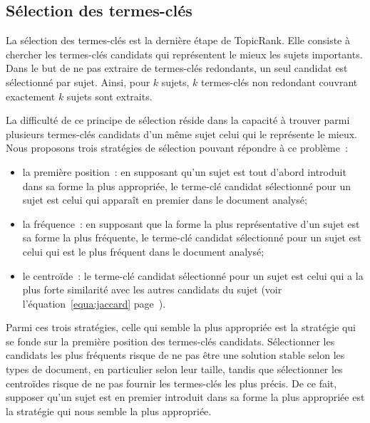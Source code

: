   \subsection{Sélection des termes-clés}
  \label{subsec:selection_des_termes_cles}
    La sélection des termes-clés est la dernière étape de TopicRank. Elle
    consiste à chercher les termes-clés candidats qui représentent le mieux les
    sujets importants. Dans le but de ne pas extraire de termes-clés redondants,
    un seul candidat est sélectionné par sujet.
    Ainsi, pour $k$ sujets, $k$ termes-clés non redondant couvrant exactement
    $k$ sujets sont extraits.

    La difficulté de ce principe de sélection réside dans la capacité à trouver
    parmi plusieurs termes-clés candidats d'un même sujet celui qui le
    représente le mieux. Nous proposons trois stratégies de sélection pouvant
    répondre à ce problème~:
    \begin{itemize}
      \item{la première position~: en supposant qu'un sujet est tout d'abord
            introduit dans sa forme la plus appropriée, le terme-clé candidat
            sélectionné pour un sujet est celui qui apparaît en premier dans le
            document analysé;}
      \item{la fréquence~: en supposant que la forme la plus représentative d'un
            sujet est sa forme la plus fréquente, le terme-clé candidat
            sélectionné pour un sujet est celui qui est le plus fréquent dans le
            document analysé;}
      \item{le centroïde~: le terme-clé candidat sélectionné pour un sujet est
            celui qui a la plus forte similarité avec les autres candidats du
            sujet (voir l'équation~\ref{equa:jaccard}
            page~\pageref{equa:jaccard}).}
    \end{itemize}
    Parmi ces trois stratégies, celle qui semble la plus appropriée est la
    stratégie qui se fonde sur la première position des termes-clés candidats.
    Sélectionner les candidats les plus fréquents risque de ne pas être une
    solution stable selon les types de document, en particulier selon leur
    taille, tandis que sélectionner les centroïdes risque de ne pas fournir les
    termes-clés les plus précis. De ce fait, supposer qu'un sujet est en premier
    introduit dans sa forme la plus appropriée est la stratégie qui nous semble
    la plus appropriée.


